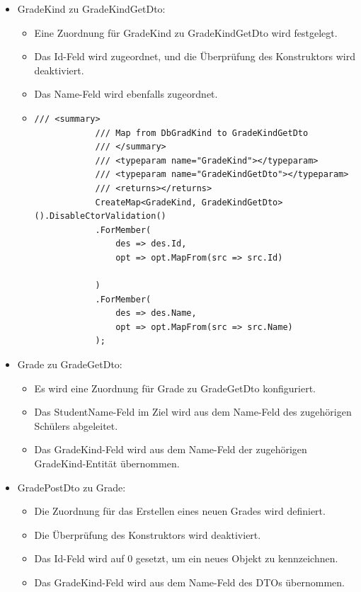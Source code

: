 \begin{itemize}
    \item GradeKind zu GradeKindGetDto:
    \begin{itemize}
        \item Eine Zuordnung für GradeKind zu GradeKindGetDto wird festgelegt.
        \item Das Id-Feld wird zugeordnet, und die Überprüfung des Konstruktors wird deaktiviert.
        \item Das Name-Feld wird ebenfalls zugeordnet.
        \item 
        \begin{lstlisting}[language={[Sharp]C}, caption=Definitation for Mapping GradeKind, label=lst:imp:profileGradeK]
            /// <summary>
            /// Map from DbGradKind to GradeKindGetDto
            /// </summary>
            /// <typeparam name="GradeKind"></typeparam>
            /// <typeparam name="GradeKindGetDto"></typeparam>
            /// <returns></returns>
            CreateMap<GradeKind, GradeKindGetDto>().DisableCtorValidation()
            .ForMember(
                des => des.Id,
                opt => opt.MapFrom(src => src.Id)
                
            )
            .ForMember(
                des => des.Name,
                opt => opt.MapFrom(src => src.Name)
            );
        \end{lstlisting}
    \end{itemize}
    \item Grade zu GradeGetDto:
    \begin{itemize}
        \item Es wird eine Zuordnung für Grade zu GradeGetDto konfiguriert.
        \item Das StudentName-Feld im Ziel wird aus dem Name-Feld des zugehörigen Schülers abgeleitet.
        \item Das GradeKind-Feld wird aus dem Name-Feld der zugehörigen GradeKind-Entität übernommen.
    \end{itemize}
    \newpage
    \item GradePostDto zu Grade:
    \begin{itemize}
        \item Die Zuordnung für das Erstellen eines neuen Grades wird definiert.
        \item Die Überprüfung des Konstruktors wird deaktiviert.
        \item Das Id-Feld wird auf 0 gesetzt, um ein neues Objekt zu kennzeichnen.
        \item Das GradeKind-Feld wird aus dem Name-Feld des DTOs übernommen.
    \end{itemize}
\end{itemize}

